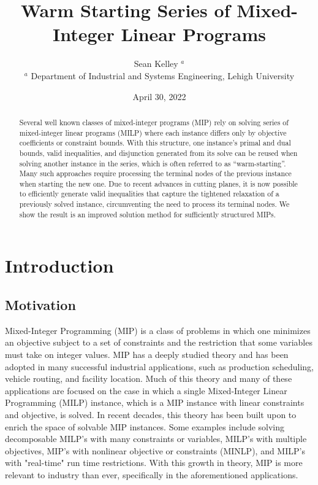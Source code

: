 \documentclass[10pt]{article}
\begin{document}
	\title{Warm Starting Series of Mixed-Integer Linear Programs}
	\author{Sean Kelley $^a$ \\
		$^a$ Department of Industrial and Systems Engineering, Lehigh University}
	\date{April 30, 2022}
	\maketitle
	
	\bigskip
	
	\begin{abstract}
		Several well known classes of mixed-integer programs (MIP) rely on solving series of mixed-integer linear programs (MILP) where each instance differs only by objective coefficients or constraint bounds. With this structure, one instance’s primal and dual bounds, valid inequalities, and disjunction generated from its solve can be reused when solving another instance in the series, which is often referred to as “warm-starting”. Many such approaches require processing the terminal nodes of the previous instance when starting the new one. Due to recent advances in cutting planes, it is now possible to efficiently generate valid inequalities that capture the tightened relaxation of a previously solved instance, circumventing the need to process its terminal nodes. We show the result is an improved solution method for sufficiently structured MIPs.
	\end{abstract}
	
	\section{Introduction} \label{s:intro}
	
	\subsection{Motivation}	\label{ss:motivation}
	Mixed-Integer Programming (MIP) is a class of problems in which one minimizes an objective subject to a set of constraints and the restriction that some variables must take on integer values. MIP has a deeply studied theory and has been adopted in many successful industrial applications, such as production scheduling, vehicle routing, and facility location. Much of this theory and many of these applications are focused on the case in which a single Mixed-Integer Linear Programming (MILP) instance, which is a MIP instance with linear constraints and objective, is solved. In recent decades, this theory has been built upon to enrich the space of solvable MIP instances. Some examples include solving decomposable MILP's with many constraints or variables, MILP's with multiple objectives, MIP's with nonlinear objective or constraints (MINLP), and MILP's with "real-time" run time restrictions. With this growth in theory, MIP is more relevant to industry than ever, specifically in the aforementioned applications. 
	
\end{document}
